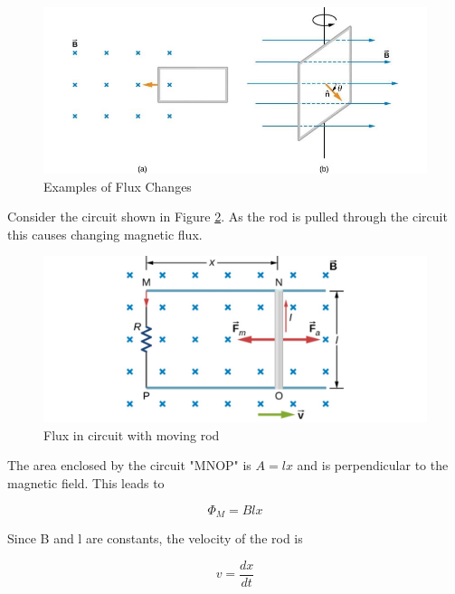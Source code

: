 \documentclass[14pt]{memoir}
\begin{document}
\begin{figure}[H]
\begin{center}
\includegraphics[scale=0.5]{fig/fig_13_11.jpg}
\caption{Examples of Flux Changes}
\label{fig:13_11}
\end{center}
\end{figure}

Consider the circuit shown in Figure \ref{fig:13_12}. As the rod is pulled through the circuit this causes changing magnetic flux. 

\begin{figure}[H]
\begin{center}
\includegraphics[scale=0.5]{fig/fig_13_12.jpg}
\caption{Flux in circuit with moving rod}
\label{fig:13_12}
\end{center}
\end{figure}

The area enclosed by the circuit "MNOP" is $A = lx$ and is perpendicular to the magnetic field. This leads to 

\begin{equation}
\Phi_M = B l x
\end{equation}

Since B and l are constants, the velocity of the rod is 

\begin{equation}
v = \frac{dx}{dt}
\end{equation}
\end{document}
